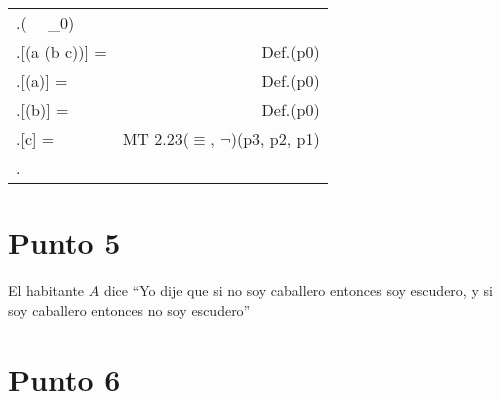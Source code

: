 \documentclass{article}
\newcommand{\q}[1]{``#1''}
\newcommand{\val}[2]{\mathbf{#1}[#2]}
\newlength{\logicv}
\newenvironment{subproofill}[1][0]{
  \begin{tcolorbox}[demo, title = ]
    \vspace*{-#1\logicv}
}{
  \end{tcolorbox}
  \vspace*{-.5cm}
}
\newenvironment{subproof}[2][0]{
  \begin{tcolorbox}[demo, title = #2, colframe = black]
  \vspace*{#1\logicv}
  \begin{logic}
}{
  \end{logic}
  \end{tcolorbox}
}
\newenvironment{logic}{
    \setlength{\extrarowheight}{3pt}
    \setcounter{row}{-1}
    \begin{center}
    \begin{NiceTabular}{>{\stepcounter{row}\therow.\hspace*{5pt}} L r }
}{
    \end{NiceTabular}
    \end{center}
}
\begin{document}
\begin{subproofill}
  \begin{subproof}{Con $\Gamma_3$}
    (\exists {} \, \vert\,   \Gamma_0)\\
    \val{v}{(a \equiv (b \equiv c))} =  & Def.(p0)\\
    \val{v}{(\neg a)} =  & Def.(p0)\\
    \val{v}{(\neg b)} =  & Def.(p0)\\
    \val{v}{c} =  & MT 2.23($\equiv$, $\neg$)(p3, p2, p1)\\
  \end{subproof}
\end{subproofill}

\section{Punto 5}

El habitante $A$ dice \q{Yo dije que si no soy caballero entonces soy escudero, y si soy caballero entonces no soy escudero}

\section{Punto 6}
\end{document}

